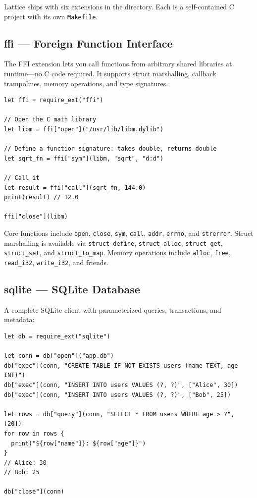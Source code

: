 Lattice ships with six extensions in the  directory.
Each is a self-contained C project with its own \lstinline|Makefile|.

\subsection{ffi --- Foreign Function Interface}

The FFI extension lets you call functions from arbitrary shared libraries at runtime---no C code required.
It supports struct marshalling, callback trampolines, memory operations, and type signatures.

\begin{lstlisting}[language=Lattice, caption={Using the FFI extension}]
let ffi = require_ext("ffi")

// Open the C math library
let libm = ffi["open"]("/usr/lib/libm.dylib")

// Define a function signature: takes double, returns double
let sqrt_fn = ffi["sym"](libm, "sqrt", "d:d")

// Call it
let result = ffi["call"](sqrt_fn, 144.0)
print(result) // 12.0

ffi["close"](libm)
\end{lstlisting}

Core functions include \lstinline|open|, \lstinline|close|, \lstinline|sym|, \lstinline|call|, \lstinline|addr|, \lstinline|errno|, and \lstinline|strerror|.
Struct marshalling is available via \lstinline|struct_define|, \lstinline|struct_alloc|, \lstinline|struct_get|, \lstinline|struct_set|, and \lstinline|struct_to_map|.
Memory operations include \lstinline|alloc|, \lstinline|free|, \lstinline|read_i32|, \lstinline|write_i32|, and friends.

\subsection{sqlite --- SQLite Database}

A complete SQLite client with parameterized queries, transactions, and metadata:

\begin{lstlisting}[language=Lattice, caption={Using the SQLite extension}]
let db = require_ext("sqlite")

let conn = db["open"]("app.db")
db["exec"](conn, "CREATE TABLE IF NOT EXISTS users (name TEXT, age INT)")
db["exec"](conn, "INSERT INTO users VALUES (?, ?)", ["Alice", 30])
db["exec"](conn, "INSERT INTO users VALUES (?, ?)", ["Bob", 25])

let rows = db["query"](conn, "SELECT * FROM users WHERE age > ?", [20])
for row in rows {
  print("${row["name"]}: ${row["age"]}")
}
// Alice: 30
// Bob: 25

db["close"](conn)
\end{lstlisting}

